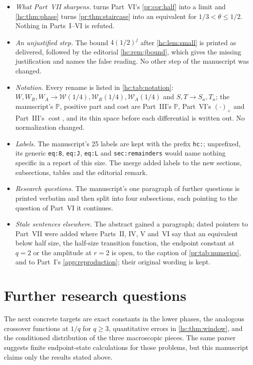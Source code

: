 \documentclass[11pt,a4paper]{article}
\theoremstyle{definition}\newaliascnt{definition}{theorem}
\theoremstyle{remark}\newaliascnt{remark}{theorem}
\newcommand{\ljP}{\mathbb P}
\newcommand{\ljcost}{\operatorname{cost}}
\newcommand{\prpos}[1]{(#1)_+}
\begin{document}
\begin{itemize}
 generalizes Part~IV's \cref{mj:lem:parse} to all $m<n$. New are
 \cref{hc:thm:window,hc:thm:phase}, the three-piece table \eqref{hc:eq:chi2}
 and its mass \eqref{hc:eq:8}, the corner and many-letter exclusions of
 \cref{hc:sec:remainders}, and the evaluation $I_3(1/2)=12\pi$; the
 manuscript's own list of new content (\cref{hc:sec:boundary}) agrees.
\item \emph{What Part~VII sharpens.}  turns Part~VI's
 \cref{pr:cor:half} into a limit and \cref{hc:thm:phase} turns
 \cref{pr:thm:staircase} into an equivalent for $1/3<\theta\le1/2$. Nothing
 in Parts~I--VI is refuted.
\item \emph{An unjustified step.} The bound $4(1/2)^j$ after
 \cref{hc:lem:small} is printed as delivered, followed by the editorial
 \cref{hc:rem:jbound}, which gives the missing justification and names the
 false reading. No other step of the manuscript was changed.
\item \emph{Notation.} Every rename is listed in \cref{hc:tab:notation}:
 $W,W_R,W_A\to\mathcal W(1/4),\mathcal W_R(1/4),\mathcal W_A(1/4)$ and
 $S,T\to S_n,T_n$; the manuscript's $\mathbb P$, positive part and cost
 are Part~III's $\ljP$, Part~VI's $\prpos{\cdot}$ and Part~III's
 $\ljcost$, and its thin space before each differential is written out. No
 normalization changed.
\item \emph{Labels.} The manuscript's 25 labels are kept with the prefix
 \texttt{hc:}; unprefixed, its generic \texttt{eq:8}, \texttt{eq:J},
 \texttt{eq:L} and \texttt{sec:remainders} would name nothing specific in a
 report of this size. The merge added labels to the new sections,
 subsections, tables and the editorial remark.
\item \emph{Research questions.} The manuscript's one paragraph of further
 questions is printed verbatim and then split into four subsections, each
 pointing to the question of Part~VI it continues.
\item \emph{Stale sentences elsewhere.} The abstract gained a paragraph;
 dated pointers to Part~VII were added where Parts~II, IV, V and~VI say
 that an equivalent below half size, the half-size transition function, the
 endpoint constant at $q=2$ or the amplitude at $r=2$ is open, to the
 caption of \cref{pr:tab:numerics}, and to Part~I's
 \cref{app:reproduction}; their original wording is kept.
\end{itemize}

\section{Further research questions}
\label{hc:sec:research}
The next concrete targets are exact constants in the lower phases, the
analogous crossover functions at $1/q$ for $q\ge3$, quantitative errors in
\cref{hc:thm:window}, and the conditioned distribution of the three
macroscopic pieces. The same parser suggests finite endpoint-state
calculations for those problems, but this manuscript claims only the results
stated above.
\end{document}
